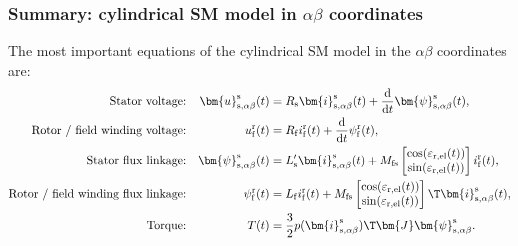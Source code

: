 \begin{frame}
	\frametitle{Summary: cylindrical SM model in $\alpha\beta$ coordinates}
	The most important equations of the cylindrical SM model in the  $\alpha\beta$ coordinates are:
	\begin{equation*}
		\begin{alignedat}{4}
			 &  & \mbox{Stator voltage:}                     &  & \quad\bm{u}^\mathrm{s}_\mathrm{s,\alpha\beta}(     & t) &  & = R_\mathrm{s} \bm{i}^\mathrm{s}_\mathrm{s,\alpha\beta}(t)+ \frac{\mathrm{d}}{\mathrm{d}t}\bm{\psi}^\mathrm{s}_\mathrm{s,\alpha\beta}(t),                                                                       \\
			 &  & \mbox{Rotor / field winding voltage:}      &  & \quad u^\mathrm{r}_\mathrm{f}(                     & t) &  & = R_\mathrm{f}i^\mathrm{r}_\mathrm{f}(t)+\frac{\mathrm{d}}{\mathrm{d}t}\psi^\mathrm{r}_\mathrm{f}(t),                                                                                                           \\
			 &  & \mbox{Stator flux linkage:}                &  & \quad \bm{\psi}^\mathrm{s}_\mathrm{s,\alpha\beta}( & t) &  & = L'_\mathrm{s} \bm{i}^\mathrm{s}_{\mathrm{s},\alpha\beta}(t) + M_\mathrm{fs} \begin{bmatrix}\cos(\varepsilon_\mathrm{r,el}(t))\\ \sin(\varepsilon_\mathrm{r,el}(t))\end{bmatrix} i^\mathrm{r}_{\mathrm{f}}(t), \\
			 &  & \mbox{Rotor / field winding flux linkage:} &  & \psi^\mathrm{r}_\mathrm{f}(                        & t) &  & = L_\mathrm{f} i^\mathrm{r}_\mathrm{f}(t) + M_\mathrm{fs} \begin{bmatrix}\cos(\varepsilon_\mathrm{r,el}(t)) \\ \sin(\varepsilon_\mathrm{r,el}(t))\end{bmatrix}\T\bm{i}^\mathrm{s}_\mathrm{s,\alpha\beta}(t),    \\
			 &  & \mbox{Torque:}                             &  & \quad T(                                           & t) &  & = \frac{3}{2} p (\bm{i}_\mathrm{s,\alpha\beta}^\mathrm{s})\T\bm{J}\bm{\psi}_\mathrm{s,\alpha\beta}^\mathrm{s}.
		\end{alignedat}
	\end{equation*}
\end{frame}

